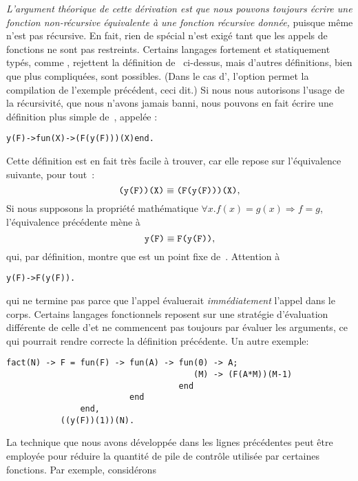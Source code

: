 \emph{L'argument théorique de cette dérivation est que nous pouvons
  toujours écrire une fonction non-récursive équivalente à une
  fonction récursive donnée,} puisque même  n'est pas
récursive. En fait, rien de spécial n'est exigé tant que les appels de
fonctions ne sont pas restreints. Certains langages fortement et
statiquement typés, comme \OCaml, rejettent la définition
de~ ci-dessus, mais d'autres définitions, bien que plus
compliquées, sont possibles. (Dans le cas d'\OCaml, l'option
 permet la compilation de l'exemple précédent, ceci
dit.) Si nous nous autorisons l'usage de la récursivité, que nous
n'avons jamais banni, nous pouvons en fait écrire une définition plus
simple de~, appelée :
\begin{alltt}
y(F) -> fun(X) -> (F(y(F)))(X) end.\hfill% \emph{Récursive}
\end{alltt}
Cette définition est en fait très facile à trouver, car elle repose
sur l'équivalence suivante, pour tout~:
\begin{equation*}
\texttt{(y(F))(X)} \equiv \texttt{(F(y(F)))(X)},
\end{equation*}
Si nous supposons la propriété mathématique \(\forall x.f(x) = g(x)
\Rightarrow f = g\), l'équivalence précédente mène à
\begin{equation*}
\texttt{y(F)} \equiv \texttt{F(y(F))},
\end{equation*}
qui, par définition, montre que  est un point fixe
de~. Attention à 
\begin{alltt}
y(F) -> F(y(F)).\hfill% \emph{Boucle infinie}
\end{alltt}
qui ne termine pas parce que l'appel  évaluerait
\emph{immédiatement} l'appel  dans le
corps. Certains langages fonctionnels reposent sur une stratégie
d'évaluation différente de celle d'\Erlang et ne commencent pas
toujours par évaluer les arguments, ce qui pourrait rendre correcte la
définition précédente. Un autre exemple:
\begin{verbatim}
fact(N) -> F = fun(F) -> fun(A) -> fun(0) -> A;
                                      (M) -> (F(A*M))(M-1)
                                   end
                         end
               end,
           ((y(F))(1))(N).
\end{verbatim}
La technique que nous avons développée dans les lignes précédentes
peut être employée pour réduire la quantité de pile de contrôle
utilisée par certaines fonctions. Par exemple, considérons
